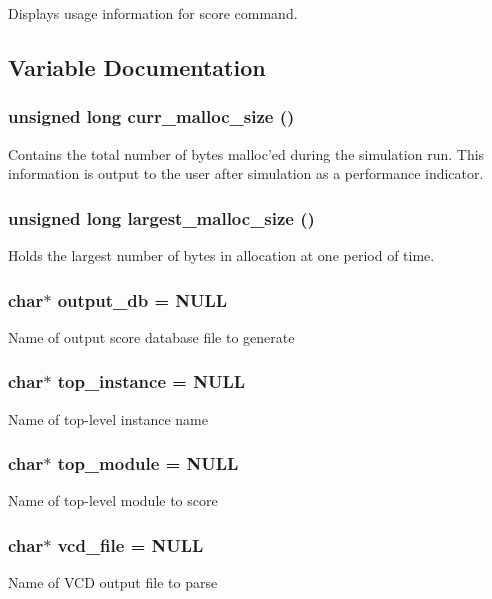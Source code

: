 Displays usage information for score command. 

\subsection{Variable Documentation}
\subsubsection{\setlength{\rightskip}{0pt plus 5cm}unsigned long curr\_\-malloc\_\-size ()}\label{score_8c_a5}


Contains the total number of bytes malloc'ed during the simulation run. This information is output to the user after simulation as a performance indicator. 
\subsubsection{\setlength{\rightskip}{0pt plus 5cm}unsigned long largest\_\-malloc\_\-size ()}\label{score_8c_a4}


Holds the largest number of bytes in allocation at one period of time. 
\subsubsection{\setlength{\rightskip}{0pt plus 5cm}char$\ast$ output\_\-db = NULL}\label{score_8c_a2}


Name of output score database file to generate 
\subsubsection{\setlength{\rightskip}{0pt plus 5cm}char$\ast$ top\_\-instance = NULL}\label{score_8c_a1}


Name of top-level instance name 
\subsubsection{\setlength{\rightskip}{0pt plus 5cm}char$\ast$ top\_\-module = NULL}\label{score_8c_a0}


Name of top-level module to score 
\subsubsection{\setlength{\rightskip}{0pt plus 5cm}char$\ast$ vcd\_\-file = NULL}\label{score_8c_a3}


Name of VCD output file to parse 
